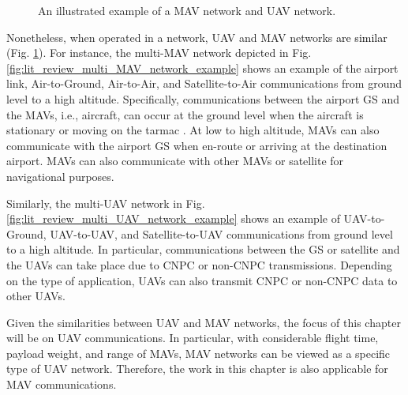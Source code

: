 \begin{figure}[t]
\centering
{}
\hfil
{}
\caption{An illustrated example of a MAV network and UAV network.}
\label{fig:lit_review_multi__UAV_MAV_network_example}
\end{figure}

Nonetheless, when operated in a network, UAV and MAV networks \textcolor{black}{are similar} (Fig. \ref{fig:lit_review_multi__UAV_MAV_network_example}). For instance, the multi-MAV network depicted in Fig. \ref{fig:lit_review_multi_MAV_network_example} shows an example of the airport link, Air-to-Ground, Air-to-Air, and Satellite-to-Air communications from ground level to a high altitude. Specifically, communications between the airport GS and the MAVs, i.e., aircraft, can occur at the ground level when the aircraft is stationary or moving on the tarmac \cite{bartoli2013aeromacs}. At low to high altitude, MAVs can also communicate with the airport GS when en-route or arriving at the destination airport. MAVs can also communicate with other MAVs or satellite for navigational purposes. 

Similarly, the multi-UAV network in Fig. \ref{fig:lit_review_multi_UAV_network_example} shows an example of UAV-to-Ground, UAV-to-UAV, and Satellite-to-UAV communications from ground level to a high altitude. In particular, communications between the GS or satellite and the UAVs can take place due to CNPC or non-CNPC transmissions. Depending on the type of application, UAVs can also transmit CNPC or non-CNPC data to other UAVs.

Given the similarities between UAV and MAV networks, the focus of this chapter will be on UAV communications. In particular, with considerable flight time, payload weight, and range of MAVs, MAV networks can be viewed as a specific type of UAV network. Therefore, the work in this chapter is also applicable for MAV communications.



